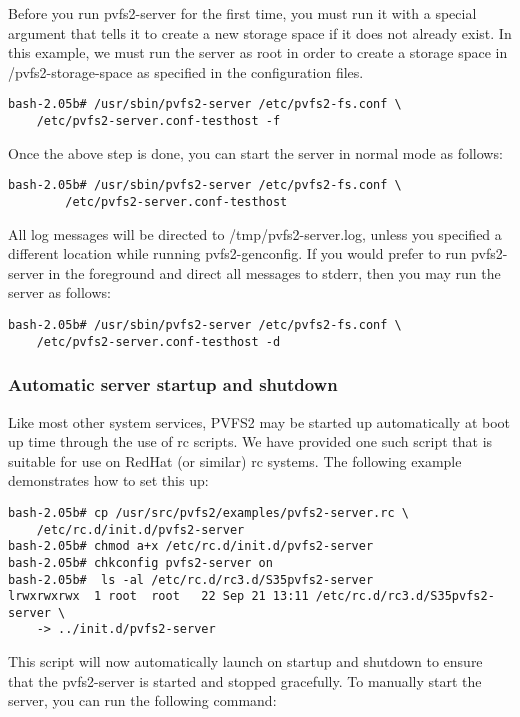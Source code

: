 \documentclass[11pt, letterpaper]{article}
\begin{document}
Before you run pvfs2-server for the first time, you must run it with a special 
argument that tells it to create a new storage space if it does not already 
exist.  In this example, we must run the server as root in order to create
a storage space in /pvfs2-storage-space as specified in the configuration
files.

\begin{verbatim}
bash-2.05b# /usr/sbin/pvfs2-server /etc/pvfs2-fs.conf \
	/etc/pvfs2-server.conf-testhost -f
\end{verbatim}

Once the above step is done, you can start the server in normal mode 
as follows:

\begin{verbatim}
bash-2.05b# /usr/sbin/pvfs2-server /etc/pvfs2-fs.conf \
		/etc/pvfs2-server.conf-testhost
\end{verbatim}

All log messages will be directed to /tmp/pvfs2-server.log, unless you specified
a different location while running pvfs2-genconfig.  If you would prefer to run 
pvfs2-server in the foreground and direct all messages to stderr, then 
you may run the server as follows:

\begin{verbatim}
bash-2.05b# /usr/sbin/pvfs2-server /etc/pvfs2-fs.conf \
	/etc/pvfs2-server.conf-testhost -d
\end{verbatim}

\subsubsection{Automatic server startup and shutdown}
\label{sec:rc}

Like most other system services, PVFS2 may be started up automatically at 
boot up time through the use of rc scripts.  We have provided one such
script that is suitable for use on RedHat (or similar) rc systems.  The 
following example demonstrates how to set this up:

\begin{verbatim}
bash-2.05b# cp /usr/src/pvfs2/examples/pvfs2-server.rc \
    /etc/rc.d/init.d/pvfs2-server
bash-2.05b# chmod a+x /etc/rc.d/init.d/pvfs2-server
bash-2.05b# chkconfig pvfs2-server on
bash-2.05b#  ls -al /etc/rc.d/rc3.d/S35pvfs2-server 
lrwxrwxrwx  1 root  root   22 Sep 21 13:11 /etc/rc.d/rc3.d/S35pvfs2-server \
    -> ../init.d/pvfs2-server
\end{verbatim}

This script will now automatically launch on startup and shutdown to 
ensure that the pvfs2-server is started and stopped gracefully.
To manually start the server, you can run the following command:
\end{document}
